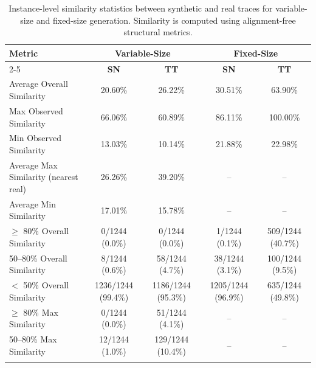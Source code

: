 \documentclass[sigconf,review]{acmart}
\begin{document}
\begin{table}
    \centering
    \begin{tabular}{lcccc}
        \hline
        \textbf{Metric} &
        \multicolumn{2}{c}{\textbf{Variable-Size}} &
        \multicolumn{2}{c}{\textbf{Fixed-Size}} \\
        \cline{2-5}
        & \textbf{SN} & \textbf{TT} & \textbf{SN} & \textbf{TT} \\
        \hline
        Average Overall Similarity
        & 20.60\% & 26.22\%
        & 30.51\% & 63.90\% \\

        Max Observed Similarity
        & 66.06\% & 60.89\%
        & 86.11\% & 100.00\% \\

        Min Observed Similarity
        & 13.03\% & 10.14\%
        & 21.88\% & 22.98\% \\

        Average Max Similarity (nearest real)
        & 26.26\% & 39.20\%
        & -- & -- \\

        Average Min Similarity
        & 17.01\% & 15.78\%
        & -- & -- \\

        $\ge$ 80\% Overall Similarity
        & 0/1244 (0.0\%) & 0/1244 (0.0\%)
        & 1/1244 (0.1\%) & 509/1244 (40.7\%) \\

        50--80\% Overall Similarity
        & 8/1244 (0.6\%) & 58/1244 (4.7\%)
        & 38/1244 (3.1\%) & 100/1244 (9.5\%) \\

        $<$ 50\% Overall Similarity
        & 1236/1244 (99.4\%) & 1186/1244 (95.3\%)
        & 1205/1244 (96.9\%) & 635/1244 (49.8\%) \\

        $\ge$ 80\% Max Similarity
        & 0/1244 (0.0\%) & 51/1244 (4.1\%)
        & -- & -- \\

        50--80\% Max Similarity
        & 12/1244 (1.0\%) & 129/1244 (10.4\%)
        & -- & -- \\
        \hline\\
    \end{tabular}
    \caption{Instance-level similarity statistics between synthetic and real traces for variable-size and fixed-size generation. Similarity is computed using alignment-free structural metrics.}
    \label{tab:instance-level-similarity}
\end{table}
\end{document}
